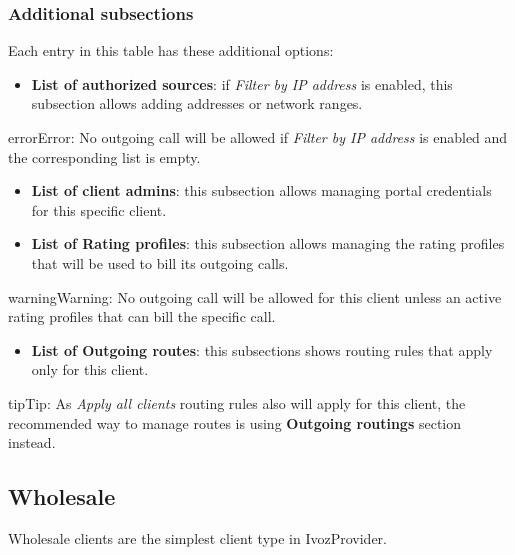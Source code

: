 \documentclass[letterpaper,10pt,english]{sphinxmanual}
\begin{document}
\subsubsection{Additional subsections}
\label{administration_portal/brand/clients/retail:additional-subsections}
Each entry in this table has these additional options:
\begin{itemize}
\item {} 
\textbf{List of authorized sources}: if \emph{Filter by IP address} is enabled, this subsection allows adding addresses or network ranges.

\end{itemize}

\begin{notice}{error}{Error:}
No outgoing call will be allowed if \emph{Filter by IP address} is enabled and the corresponding list is empty.
\end{notice}
\begin{itemize}
\item {} 
\textbf{List of client admins}: this subsection allows managing portal credentials for this specific client.

\item {} 
\textbf{List of Rating profiles}: this subsection allows managing the rating profiles that will be used to bill its outgoing calls.

\end{itemize}

\begin{notice}{warning}{Warning:}
No outgoing call will be allowed for this client unless an active rating profiles that can
bill the specific call.
\end{notice}
\begin{itemize}
\item {} 
\textbf{List of Outgoing routes}: this subsections shows routing rules that apply only for this client.

\end{itemize}

\begin{notice}{tip}{Tip:}
As \emph{Apply all clients} routing rules also will apply for this client, the recommended way to manage routes is
using \textbf{Outgoing routings} section instead.
\end{notice}


\subsection{Wholesale}
\label{administration_portal/brand/clients/wholesale:wholesale}\label{administration_portal/brand/clients/wholesale:wholesale-clients}\label{administration_portal/brand/clients/wholesale::doc}
Wholesale clients are the simplest client type in IvozProvider.
\end{document}

